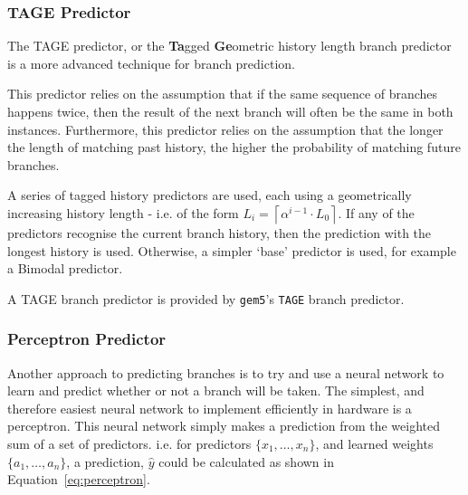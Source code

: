 \subsubsection{TAGE Predictor}
%

The TAGE predictor, or the \textbf{Ta}gged \textbf{Ge}ometric history
length branch predictor is a more advanced technique for branch
prediction.

This predictor relies on the assumption that if the same sequence of
branches happens twice, then the result of the next branch will often
be the same in both instances.
Furthermore, this predictor relies on the assumption that the longer
the length of matching past history, the higher
the probability of matching future branches.~\cite{Seznec2006}

A series of tagged history predictors are used, each using a geometrically
increasing history length - i.e. of the form
\(L_i = \left\lceil \alpha^{i-1} \cdot L_0 \right\rceil\).
If any of the predictors recognise the current branch history,
then the prediction with the longest history is used.
Otherwise, a simpler `base' predictor is used, for example a Bimodal
predictor.~\cite{Seznec2007,Michaud2005}

A TAGE branch predictor is provided by \texttt{gem5}'s \texttt{TAGE}
branch predictor. %

\subsubsection{Perceptron Predictor}

%

Another approach to predicting branches is to try and use a
neural network to learn and predict whether or not a branch will
be taken.
The simplest, and therefore easiest neural network to implement
efficiently in hardware is a perceptron.
This neural network simply makes a prediction from the weighted
sum of a set of predictors. i.e. for predictors \(\{ x_1, \ldots , x_n \}\),
and learned weights \(\{ a_1, \ldots , a_n \}\), a prediction, \(\hat{y}\) could
be calculated as shown in Equation~\ref{eq:perceptron}.

